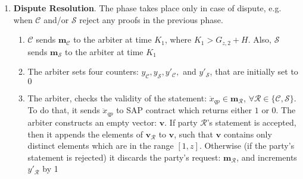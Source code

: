 \begin{enumerate}
\begin{enumerate}

\end{enumerate}
\item \textbf{Dispute Resolution}\label{RCSP::Dispute-Resolution}. The phase takes place only in  case of dispute, e.g. when $\mathcal C$ and/or $\mathcal S$ reject any proofs in the previous phase. %

\begin{enumerate}
\item $\mathcal C$  sends $\bm{m}_{\scriptscriptstyle\mathcal C}$ to the arbiter at time $K_{\scriptscriptstyle 1}$, where $K_{\scriptscriptstyle 1}>G_{\scriptscriptstyle z,2}+H$.  Also,  $\mathcal S$ sends $\bm{m}_{\scriptscriptstyle\mathcal S}$ to the arbiter at time $K_{\scriptscriptstyle 1}$ %


\item The arbiter sets four counters: $y_{\scriptscriptstyle\mathcal C}, y_{\scriptscriptstyle\mathcal S}, y'_{\scriptscriptstyle\mathcal C},$ and $y'_{\scriptscriptstyle\mathcal S}$, that are initially set to $0$ 

\item\label{arbiter-checks-statement} The arbiter, checks the validity of the statement: $\ddot{x}_{\scriptscriptstyle qp}\in \bm{m}_{\scriptscriptstyle\mathcal R}$,  $\forall \mathcal R\in \{\mathcal {C,S}\}$. To do that, it sends  $\ddot{x}_{\scriptscriptstyle qp}$ to SAP contract which  returns  either $1$ or $0$. The arbiter  constructs an empty vector: $\bm{v}$.  If  party $\mathcal R$'s statement is accepted, then 
 it appends the elements of $\bm{v}_{\scriptscriptstyle\mathcal{R}}$ to $\bm{v}$, such that $\bm{v}$ contains only distinct elements which are in the range $[1,z]$. Otherwise (if the party's statement is rejected) it discards the party's request: $\bm{m}_{\scriptscriptstyle\mathcal{R}}$, and increments $ y'_{\scriptscriptstyle\mathcal R}$ by 1


\end{enumerate}
\end{enumerate}
